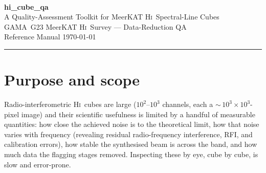\documentclass[11pt,a4paper]{article}
\begin{document}
\begin{center}
  {\hcqalogo[1.7]}\\[14pt]
  {\LARGE\bfseries\ttfamily hi\_cube\_qa}\\[6pt]
  {\large A Quality-Assessment Toolkit for MeerKAT \textsc{Hi}\ Spectral-Line Cubes}\\[10pt]
  {\normalsize GAMA~G23 MeerKAT \textsc{Hi}\ Survey --- Data-Reduction QA}\\[2pt]
  {\normalsize Reference Manual \quad\textbullet\quad \today}
\end{center}
\noindent\rule{\textwidth}{0.6pt}
\vspace{6pt}

\begin{abstract}
\noindent
{} is a Python toolkit that turns the spectral-line cubes
produced by the \textsc{CARACal} pipeline \citep{jozsa2020} into a single,
self-contained, interactive HTML quality-assessment (QA) report \emph{per
observation session}. It auto-discovers every cube under a session's directory
tree, measures the per-channel noise, the synthesised-beam behaviour, and the
spectral response of each imaging product (, ,
, \dots), compares the measured noise against the
radiometer-equation expectation, and flags channels and cubes that fall outside
expert-defined tolerances. This document describes the scientific motivation
behind every metric, the exact quantities the code computes, and how to
configure and run the toolkit. A companion \emph{Quickstart} covers the common
workflow in two pages.
\end{abstract}

\tableofcontents
\bigskip

\section{Purpose and scope}
Radio-interferometric \textsc{Hi}\ cubes are large ($10^2$--$10^3$ channels,
each a $\sim$\,$10^3\times10^3$-pixel image) and their scientific usefulness is
limited by a handful of measurable quantities: how close the achieved noise is
to the theoretical limit, how that noise varies with frequency (revealing
residual radio-frequency interference, RFI, and calibration errors), how stable
the synthesised beam is across the band, and how much data the flagging stages
removed. Inspecting these by eye, cube by cube, is slow and error-prone.
\end{document}
